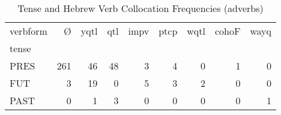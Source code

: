 \begin{table}[htbp!]
\centering
\caption{Tense and Hebrew Verb Collocation Frequencies (adverbs)}
\label{table:advb_tense_ct}
\begin{tabular}{lrrrrrrrr}
\toprule
verbform &    Ø &  yqtl &  qtl &  impv &  ptcp &  wqtl &  cohoF &  wayq \\
tense &      &       &      &       &       &       &        &       \\
\midrule
PRES  &  261 &    46 &   48 &     3 &     4 &     0 &      1 &     0 \\
FUT   &    3 &    19 &    0 &     5 &     3 &     2 &      0 &     0 \\
PAST  &    0 &     1 &    3 &     0 &     0 &     0 &      0 &     1 \\
\bottomrule
\end{tabular}
\end{table}
